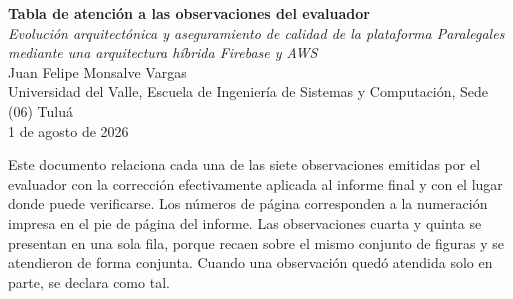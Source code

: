 \documentclass[11pt]{article}
\newcommand{\titulotg}{Evolución arquitectónica y aseguramiento de calidad de la plataforma Paralegales mediante una arquitectura híbrida Firebase y AWS}
\newcommand{\autortg}{Juan Felipe Monsalve Vargas}
\newcommand{\fecha}{1 de agosto de 2026}
\begin{document}
\begin{center}
  {\Large\bfseries Tabla de atención a las observaciones del evaluador}\\[0.7em]
  {\normalsize\itshape \titulotg}\\[0.9em]
  {\normalsize \autortg}\\[0.3em]
  {\small Universidad del Valle, Escuela de Ingeniería de Sistemas y Computación, Sede (06) Tuluá}\\[0.3em]
  {\small \fecha}
\end{center}

\vspace{0.6em}

\noindent
Este documento relaciona cada una de las siete observaciones emitidas por el evaluador con la corrección
efectivamente aplicada al informe final y con el lugar donde puede verificarse. Los números de página
corresponden a la numeración impresa en el pie de página del informe. Las observaciones cuarta y quinta
se presentan en una sola fila, porque recaen sobre el mismo conjunto de figuras y se atendieron de forma
conjunta. Cuando una observación quedó atendida solo en parte, se declara como tal.

\vspace{0.8em}
\end{document}
